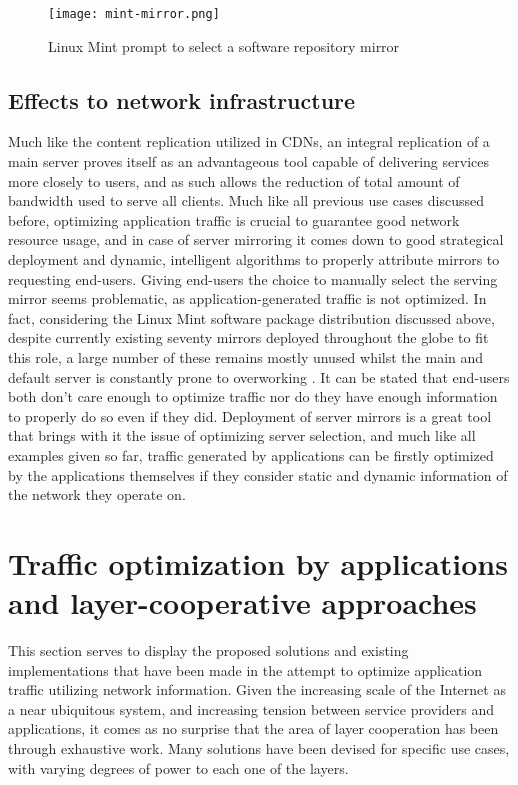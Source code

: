     \begin{figure}[!h]
    \centering
    \texttt{[image: mint-mirror.png]}
    \caption{Linux Mint prompt to select a software repository mirror}
    \label{fig:mint-mirrors}
    \end{figure}

    \subsection{Effects to network infrastructure}

        Much like the content replication utilized in CDNs, an integral replication of a main server proves itself as an advantageous tool capable of delivering services more closely to users, and as such allows the reduction of total amount of bandwidth used to serve all clients.
        Much like all previous use cases discussed before, optimizing application traffic is crucial to guarantee good network resource usage, and in case of server mirroring it comes down to good strategical deployment and dynamic, intelligent algorithms to properly attribute mirrors to requesting end-users.
        Giving end-users the choice to manually select the serving mirror seems problematic, as application-generated traffic is not optimized.
        In fact, considering the Linux Mint software package distribution discussed above, despite currently existing seventy mirrors deployed throughout the globe to fit this role, a large number of these remains mostly unused whilst the main and default server is constantly prone to overworking \cite{mint-article}.
        It can be stated that end-users both don't care enough to optimize traffic nor do they have enough information to properly do so even if they did.
        Deployment of server mirrors is a great tool that brings with it the issue of optimizing server selection, and much like all examples given so far, traffic generated by applications can be firstly optimized by the applications themselves if they consider static and dynamic information of the network they operate on.

    \section{Traffic optimization by applications and layer-cooperative approaches}

        This section serves to display the proposed solutions and existing implementations that have been made in the attempt to optimize application traffic utilizing network information.
        Given the increasing scale of the Internet as a near ubiquitous system, and increasing tension between service providers and applications, it comes as no surprise that the area of layer cooperation has been through exhaustive work.
        Many solutions have been devised for specific use cases, with varying degrees of power to each one of the layers.

